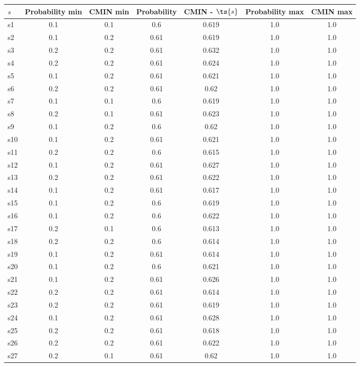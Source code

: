 \documentclass{article}
\begin{document}
\noindent\begin{tabular}{|l|c|c|c|c|c|c|}
\hline
$s$& Probability min & CMIN min & Probability & CMIN - $\ts{s}$ & Probability max & CMIN max\\
\hline
s1 &0.1 & 0.1 & 0.6 & 0.619 & 1.0 & 1.0\\
\hline
s2 &0.1 & 0.2 & 0.61 & 0.619 & 1.0 & 1.0\\
\hline
s3 &0.2 & 0.2 & 0.61 & 0.632 & 1.0 & 1.0\\
\hline
s4 &0.2 & 0.2 & 0.61 & 0.624 & 1.0 & 1.0\\
\hline
s5 &0.1 & 0.2 & 0.61 & 0.621 & 1.0 & 1.0\\
\hline
s6 &0.2 & 0.2 & 0.61 & 0.62 & 1.0 & 1.0\\
\hline
s7 &0.1 & 0.1 & 0.6 & 0.619 & 1.0 & 1.0\\
\hline
s8 &0.2 & 0.1 & 0.61 & 0.623 & 1.0 & 1.0\\
\hline
s9 &0.1 & 0.2 & 0.6 & 0.62 & 1.0 & 1.0\\
\hline
s10 &0.1 & 0.2 & 0.61 & 0.621 & 1.0 & 1.0\\
\hline
s11 &0.2 & 0.2 & 0.6 & 0.615 & 1.0 & 1.0\\
\hline
s12 &0.1 & 0.2 & 0.61 & 0.627 & 1.0 & 1.0\\
\hline
s13 &0.2 & 0.2 & 0.61 & 0.622 & 1.0 & 1.0\\
\hline
s14 &0.1 & 0.2 & 0.61 & 0.617 & 1.0 & 1.0\\
\hline
s15 &0.1 & 0.2 & 0.6 & 0.619 & 1.0 & 1.0\\
\hline
s16 &0.1 & 0.2 & 0.6 & 0.622 & 1.0 & 1.0\\
\hline
s17 &0.2 & 0.1 & 0.6 & 0.613 & 1.0 & 1.0\\
\hline
s18 &0.2 & 0.2 & 0.6 & 0.614 & 1.0 & 1.0\\
\hline
s19 &0.1 & 0.2 & 0.61 & 0.614 & 1.0 & 1.0\\
\hline
s20 &0.1 & 0.2 & 0.6 & 0.621 & 1.0 & 1.0\\
\hline
s21 &0.1 & 0.2 & 0.61 & 0.626 & 1.0 & 1.0\\
\hline
s22 &0.2 & 0.2 & 0.61 & 0.614 & 1.0 & 1.0\\
\hline
s23 &0.2 & 0.2 & 0.61 & 0.619 & 1.0 & 1.0\\
\hline
s24 &0.1 & 0.2 & 0.61 & 0.628 & 1.0 & 1.0\\
\hline
s25 &0.2 & 0.2 & 0.61 & 0.618 & 1.0 & 1.0\\
\hline
s26 &0.2 & 0.2 & 0.61 & 0.622 & 1.0 & 1.0\\
\hline
s27 &0.2 & 0.1 & 0.61 & 0.62 & 1.0 & 1.0\\

\end{tabular}
\end{document}
